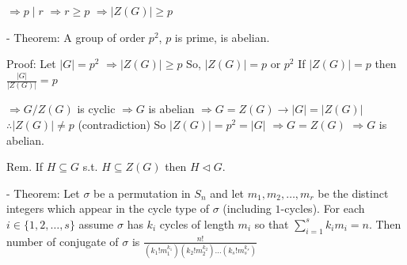 $\Rightarrow p \mid r$
$\Rightarrow r \geq p$
$\Rightarrow |Z(G)| \geq p$

- Theorem: A group of order $p^2$, $p$ is prime, is abelian.

Proof: Let $|G| = p^2$
$\Rightarrow |Z(G)| \geq p$
So, $|Z(G)| = p$ or $p^2$
If $|Z(G)| = p$ then $\frac{|G|}{|Z(G)|} = p$

$\Rightarrow G/Z(G)$ is cyclic
$\Rightarrow G$ is abelian
$\Rightarrow G = Z(G) \rightarrow |G| = |Z(G)|$
$\therefore |Z(G)| \neq p$ (contradiction)
So $|Z(G)| = p^2 = |G|$
$\Rightarrow G = Z(G)$
$\Rightarrow G$ is abelian.

Rem. If $H \subseteq G$ s.t. $H \subseteq Z(G)$ then $H \triangleleft G$.

- Theorem: Let $\sigma$ be a permutation in $S_n$ and let $m_1, m_2, \dots, m_r$ be the distinct integers which appear in the cycle type of $\sigma$ (including $1$-cycles). For each $i \in \{1, 2, \dots, s\}$ assume $\sigma$ has $k_i$ cycles of length $m_i$ so that $\sum_{i=1}^s k_i m_i = n$. Then number of conjugate of $\sigma$ is $\frac{n!}{(k_1! m_1^{k_1})(k_2! m_2^{k_2}) \dots (k_s! m_s^{k_s})}$
